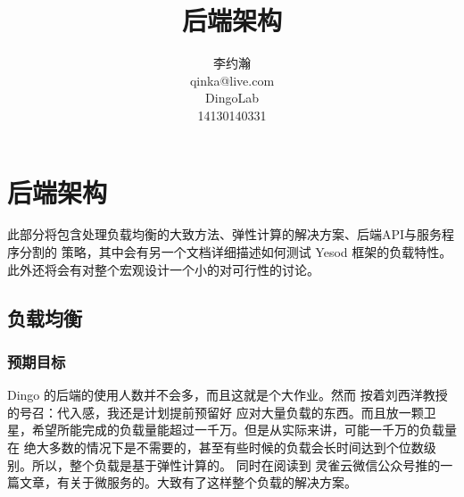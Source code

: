 








\makeatletter
\def\@NoStyleChaper{\ralex} %
\def\@ARCHDoc{\ralex} %
\def\@UsingAppendix{\ralex} %
\def\@DocType{article}
\def\@DocTypeCTEX{ctexart}
\def\primarykey#1{\colorbox[rgb]{0.9,0.7,0.65}{#1}}
\makeatother


    \makeatletter
     \newcommand{\mcite}[1]{$^{\tiny\cite{#1}}$}
     \newcommand{\mbibitem}[1]{\bibitem[#1]{#1}\addtocounter{myBib}{1}}
     \setcounter{myBib}{1}
     \makeatother

\title{后端架构}
\author{李约瀚 \\ qinka@live.com \\ DingoLab \\ 14130140331}


\maketitle
\newpage

\section{后端架构}

此部分将包含处理负载均衡的大致方法、弹性计算的解决方案、后端API与服务程序分割的
策略，其中会有另一个文档详细描述如何测试 Yesod 框架的负载特性。
此外还将会有对整个宏观设计一个小的对可行性的讨论。


\subsection{负载均衡}
\subsubsection{预期目标}
Dingo 的后端的使用人数并不会多，而且这就是个大作业。然而 按着刘西洋教授的号召：代入感，我还是计划提前预留好
应对大量负载的东西。而且放一颗卫星，希望所能完成的负载量能超过一千万。但是从实际来讲，可能一千万的负载量在
绝大多数的情况下是不需要的，甚至有些时候的负载会长时间达到个位数级别。所以，整个负载是基于弹性计算的。
同时在阅读到 灵雀云微信公众号推的一篇文章，有关于微服务的。大致有了这样整个负载的解决方案。
